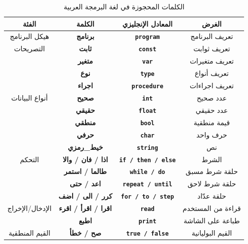 \documentclass[12pt,a4paper]{report}
\newcommand{\keyword}[1]{\textcolor{CodeKeyword}{\textbf{\texttt{#1}}}}
\newcommand{\arabickw}[1]{\textcolor{GoldYellow}{\textbf{\arabicfont #1}}}
\begin{document}
\begin{table}[H]
\caption{\arabicfont الكلمات المحجوزة في لغة البرمجة العربية}
\label{tab:keywords}
\centering
\small
\begin{tabular}{|c|c|c|c|}
\hline
\rowcolor{TableHead}
\textbf{\arabicfont الفئة} & \textbf{\arabicfont الكلمة} & \textbf{\arabicfont المعادل الإنجليزي} & \textbf{\arabicfont الغرض} \\
\hline
\arabicfont هيكل البرنامج & \arabickw{برنامج} & \keyword{program} & \arabicfont تعريف البرنامج \\
\hline
\rowcolor{TableAlt}
\arabicfont التصريحات & \arabickw{ثابت} & \keyword{const} & \arabicfont تعريف ثوابت \\
& \arabickw{متغير} & \keyword{var} & \arabicfont تعريف متغيرات \\
& \arabickw{نوع} & \keyword{type} & \arabicfont تعريف أنواع \\
& \arabickw{اجراء} & \keyword{procedure} & \arabicfont تعريف اجراءات \\
\hline
\arabicfont أنواع البيانات & \arabickw{صحيح} & \keyword{int} & \arabicfont عدد صحيح \\
& \arabickw{حقيقي} & \keyword{float} & \arabicfont عدد حقيقي \\
& \arabickw{منطقي} & \keyword{bool} & \arabicfont قيمة منطقية \\
& \arabickw{حرفي} & \keyword{char} & \arabicfont حرف واحد \\
& \arabickw{خيط\_رمزي} & \keyword{string} & \arabicfont نص \\
\hline
\rowcolor{TableAlt}
\arabicfont التحكم & \arabickw{اذا / فان / والا} & \keyword{if / then / else} & \arabicfont الشرط \\
& \arabickw{طالما / استمر} & \keyword{while / do} & \arabicfont حلقة شرط مسبق \\
& \arabickw{اعد / حتى} & \keyword{repeat / until} & \arabicfont حلقة شرط لاحق \\
& \arabickw{كرر / الى / اضف} & \keyword{for / to / step} & \arabicfont حلقة عدّاد \\
\hline
\arabicfont الإدخال/الإخراج & \arabickw{اقرا / اقرأ / اقرء} & \keyword{read} & \arabicfont قراءة من المستخدم \\
& \arabickw{اطبع} & \keyword{print} & \arabicfont طباعة على الشاشة \\
\hline
\rowcolor{TableAlt}
\arabicfont القيم المنطقية & \arabickw{صح / خطأ} & \keyword{true / false} & \arabicfont القيم البوليانية \\
\hline
\end{tabular}
\end{table}
\end{document}
